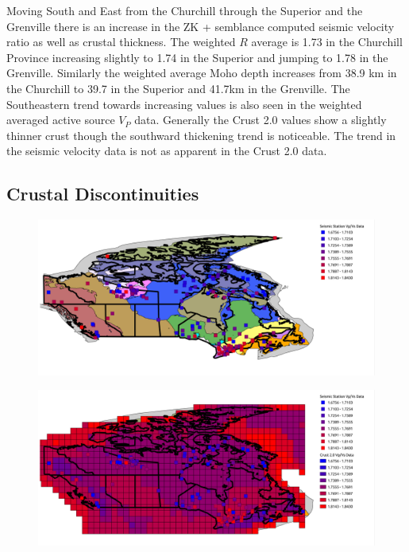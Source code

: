 \documentclass[draft, 12pt]{article}
\begin{document}
Moving South and East from the Churchill through the Superior and the Grenville there is an increase in the ZK + semblance computed seismic velocity ratio as well as crustal thickness. The weighted $R$ average is 1.73 in the Churchill Province increasing slightly to 1.74 in the Superior and jumping to 1.78 in the Grenville. Similarly the weighted average Moho depth increases from 38.9 km in the Churchill to 39.7 in the Superior and 41.7km in the Grenville. The Southeastern trend towards increasing values is also seen in the weighted averaged active source $V_P$ data.  Generally the Crust 2.0 values show a slightly thinner crust though the southward thickening trend is noticeable. The trend in the seismic velocity data is not as apparent in the Crust 2.0 data.

\subsection{Crustal Discontinuities}


\begin{figure}
  \centering
  \includegraphics[width=\textwidth]{VpVsMap}
  \caption{}
  \label{fig:VpVsMap}
\end{figure}

\begin{figure}
  \centering
  \includegraphics[width=\textwidth]{VpVsMapCrust}
  \caption{}
  \label{fig:VpVsMapCrust}
\end{figure}
\end{document}
